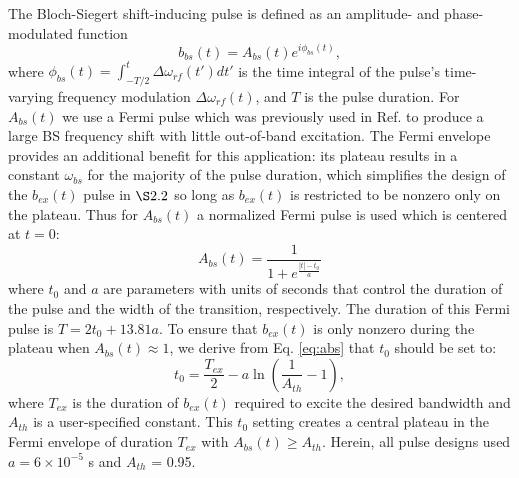 \documentclass{article}
\newcommand{\bext}{b_{ex}(t)}
\newcommand{\bbst}{b_{bs}(t)}
\begin{document}
\par The Bloch-Siegert shift-inducing pulse is defined as an amplitude- and phase-modulated function
\begin{equation}
    \bbst = A_{bs}(t)e^{i \phi_{bs}(t)},
\end{equation}
where $\phi_{bs}(t) = \int_{-T/2}^{t} \Delta\omega_{rf}(t') dt'$ 
is the time integral of the pulse's time-varying frequency modulation $\Delta \omega_{rf}(t)$,
and $T$ is the pulse duration. 
For $A_{bs}(t)$ we use a Fermi pulse
which was previously used in Ref. \cite{Sacolick2010B1Shift}   
to produce a large BS frequency shift with little out-of-band excitation. 
The Fermi envelope provides an additional benefit for this application: 
its plateau results in a constant
$\omega_{bs}$ for the majority of the pulse duration, 
which simplifies the design of the $\bext$ pulse in $\S 2.2$ 
so long as $\bext$ is restricted to be nonzero only on the plateau.
Thus for $A_{bs}(t)$ a normalized Fermi pulse is used which is  
centered at $t=0$:
\begin{equation}
    A_{bs}(t) =     	\frac{1}{1+e^{\frac{|t|-t_0}{a}}}
    \label{eq:abs}
\end{equation}
where $t_0$ and $a$ are parameters with units of seconds 
that control the duration of the pulse and the width of the transition, respectively. The duration of this Fermi pulse is $T = 2 t_0 + 13.81 a$.
To ensure that $\bext$ is only nonzero during the plateau when $A_{bs}(t) \approx 1$, 
we derive from Eq. \ref{eq:abs} that $t_0$ should be set to:
\begin{equation}
    t_0 = \frac{T_{ex}}{2}-a\ln{\left(\frac{1}{A_{th}}-1\right)},
\end{equation} 
where $T_{ex}$ is the duration of $\bext$ required to excite the desired bandwidth
and $A_{th}$ is a user-specified constant. 
This $t_0$ setting 
creates a central plateau in the Fermi envelope of duration $T_{ex}$ with $A_{bs}(t) \geq A_{th}$. 
Herein, all pulse designs used $a = 6\times10^{-5}$ s and $A_{th}$ = 0.95.
\end{document}
